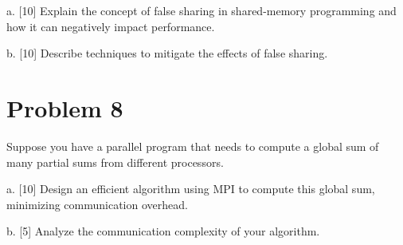 \documentclass{article}
\begin{document}
a. [10] Explain the concept of false sharing in shared-memory programming and how it can negatively impact performance.

b. [10] Describe techniques to mitigate the effects of false sharing.


\section*{Problem 8}

Suppose you have a parallel program that needs to compute a global sum of many partial sums from different processors.

a. [10] Design an efficient algorithm using MPI to compute this global sum, minimizing communication overhead.

b. [5]  Analyze the communication complexity of your algorithm.
\end{document}
